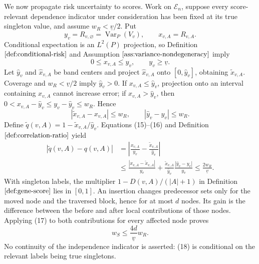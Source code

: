 We now propagate risk uncertainty to scores. Work on \(\mathcal E_n\), suppose every score-relevant dependence indicator under consideration has been fixed at its true singleton value, and assume \(w_R<\underline v/2\). Put
\[
 y_v=R_{v,\varnothing}=\operatorname{Var}_P(V_v),
 \qquad x_{v,A}=R_{v,A}.
\]
Conditional expectation is an \(L^2(P)\) projection, so Definition \(\ref{def:conditional-risk}\) and Assumption \(\ref{ass:variance-nondegeneracy}\) imply
\[
 0\le x_{v,A}\le y_v,
 \qquad y_v\ge\underline v. \tag{15}
\]
Let \(\widehat y_v\) and \(\widehat x_{v,A}\) be band centers and project \(\widehat x_{v,A}\) onto \([0,\widehat y_v]\), obtaining \(\widetilde x_{v,A}\). Coverage and \(w_R<\underline v/2\) imply \(\widehat y_v>0\). If \(x_{v,A}\le\widehat y_v\), projection onto an interval containing \(x_{v,A}\) cannot increase error; if \(x_{v,A}>\widehat y_v\), then \(0<x_{v,A}-\widehat y_v\le y_v-\widehat y_v\le w_R\). Hence
\[
 |\widetilde x_{v,A}-x_{v,A}|\le w_R,
 \qquad |\widehat y_v-y_v|\le w_R. \tag{16}
\]
Define \(\widetilde q(v,A)=1-\widetilde x_{v,A}/\widehat y_v\). Equations (15)--(16) and Definition \(\ref{def:correlation-ratio}\) yield
\[
\begin{aligned}
 |\widetilde q(v,A)-q(v,A)|
 &=\left|\frac{x_{v,A}}{y_v}
       -\frac{\widetilde x_{v,A}}{\widehat y_v}\right|\\
 &\le\frac{|x_{v,A}-\widetilde x_{v,A}|}{y_v}
 +\frac{\widetilde x_{v,A}}{\widehat y_v}
  \frac{|\widehat y_v-y_v|}{y_v}
 \le\frac{2w_R}{\underline v}. \tag{17}
\end{aligned}
\]
With singleton labels, the multiplier \(1-D(v,A)/(|A|+1)\) in Definition \(\ref{def:gene-score}\) lies in \([0,1]\). An insertion changes predecessor sets only for the moved node and the traversed block, hence for at most \(d\) nodes. Its gain is the difference between the before and after local contributions of those nodes. Applying (17) to both contributions for every affected node proves
\[
 w_S\le\frac{4d}{\underline v}w_R. \tag{18}
\]
No continuity of the independence indicator is asserted: (18) is conditional on the relevant labels being true singletons.

